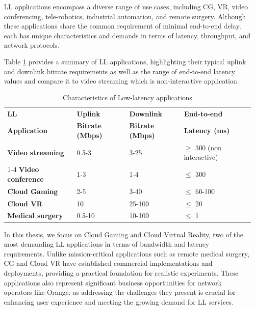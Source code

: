 \ac{LL} applications encompass a diverse range of use cases, including \ac{CG}, \ac{VR}, video conferencing, tele-robotics, industrial automation, and remote surgery. Although these applications share the common requirement of minimal end-to-end delay, each has unique characteristics and demands in terms of latency, throughput, and network protocols. 

Table \ref{tab:ll_applications} provides a summary of LL applications, highlighting their typical uplink and downlink bitrate requirements as well as the range of end-to-end latency values and compare it to video streaming which is non-interactive application.
\begin{table}[!ht]
\setlength\tabcolsep{1pt} 
    
\begin{tabular*}{\linewidth}{@{\extracolsep{\fill}} llll}
    \toprule
       \bf LL & \bf Uplink & \bf Downlink & \bf End-to-end \\
       \bf Application & \bf Bitrate (Mbps) & \bf Bitrate (Mbps) & \bf Latency (ms) \\
    \addlinespace
    \cmidrule{1-4}
    \bf Video streaming & 0.5-3  & 3-25 & $\geq$ 300 (non interactive) \\
    \cmidrule{1-4}
    \bf Video conference & 1-3 & 1-4 & $\leq$ 300 \\
    \bf Cloud Gaming  & 2-5 & 3-40 & $\leq$ 60-100 \\
    \bf Cloud VR & 10 &  25-100 & $\leq$ 20 \\
    \bf Medical surgery & 0.5-10 & 10-100 & $\leq$ 1 \\
    \bottomrule

\end{tabular*}
\caption{Characteristics of Low-latency applications}
\label{tab:ll_applications}
\end{table}

In this thesis, we focus on Cloud Gaming and Cloud Virtual Reality, two of the most demanding LL applications in terms of bandwidth and latency requirements. Unlike mission-critical applications such as remote medical surgery, CG and Cloud VR have established commercial implementations and deployments, providing a practical foundation for realistic experiments. These applications also represent significant business opportunities for network operators like Orange, as addressing the challenges they present is crucial for enhancing user experience and meeting the growing demand for LL services.

